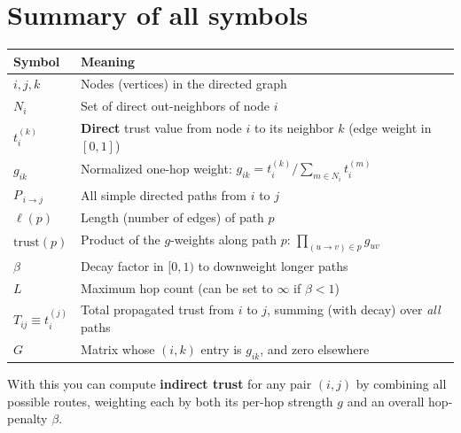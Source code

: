 \documentclass{article}
\begin{document}
\section*{Summary of all symbols}

\begin{center}
\begin{tabular}{>{\raggedright}p{3cm}>{\raggedright\arraybackslash}p{9cm}}
\toprule
\textbf{Symbol} & \textbf{Meaning} \\
\midrule
\(i,j,k\) & Nodes (vertices) in the directed graph \\
\(N_i\) & Set of direct out-neighbors of node \(i\) \\
\(t_i^{(k)}\) & \textbf{Direct} trust value from node \(i\) to its neighbor \(k\) (edge weight in \([0,1]\)) \\
\(g_{ik}\) & Normalized one-hop weight: \(g_{ik} = t_i^{(k)} / \sum_{m\in N_i}t_i^{(m)}\) \\
\(P_{\,i\to j}\) & All simple directed paths from \(i\) to \(j\) \\
\(\ell(p)\) & Length (number of edges) of path \(p\) \\
\(\mathrm{trust}(p)\) & Product of the \(g\)-weights along path \(p\): \(\prod_{(u\to v)\in p}g_{uv}\) \\
\(\beta\) & Decay factor in \([0,1)\) to downweight longer paths \\
\(L\) & Maximum hop count (can be set to \(\infty\) if \(\beta<1\)) \\
\(T_{ij}\equiv t_i^{(j)}\) & Total propagated trust from \(i\) to \(j\), summing (with decay) over \emph{all} paths \\
\(G\) & Matrix whose \((i,k)\) entry is \(g_{ik}\), and zero elsewhere \\
\bottomrule
\end{tabular}
\end{center}

With this you can compute \textbf{indirect trust} for any pair \((i,j)\) by combining all possible routes, weighting each by both its per-hop strength \(g\) and an overall hop-penalty \(\beta\).
\end{document}
